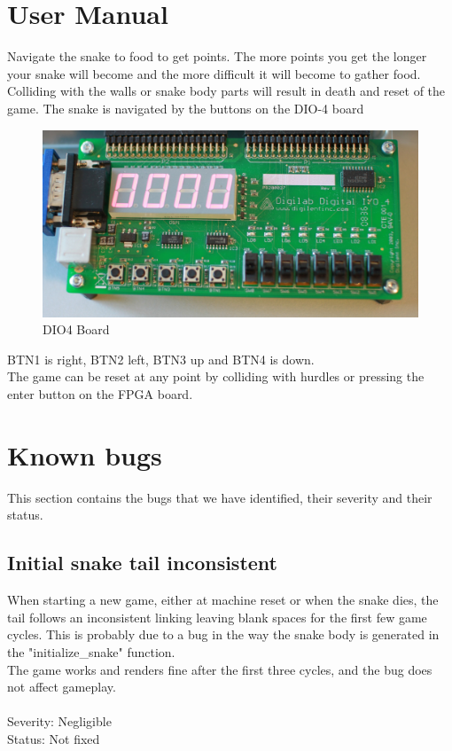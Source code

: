 \documentclass{acm_proc_article-sp}
\begin{document}
\section{User Manual}
Navigate the snake to food to get points. The more points you get the longer your snake will become and the more difficult it will become to gather food.
Colliding with the walls or snake body parts will result in death and reset of the game. The snake is navigated by the buttons on the DIO-4 board 
\begin{figure}[h]
\centering
\includegraphics[scale=0.064]{img/DIO4Buttons.jpg} 
\caption{DIO4 Board}
\label{fig:dio4board}
\end{figure}

BTN1 is right, BTN2 left, BTN3 up and BTN4 is down.\\
The game can be reset at any point by colliding with hurdles or pressing the enter button on the FPGA board.

\section{Known bugs}
This section contains the bugs that we have identified, their severity and their status.
\subsection{Initial snake tail inconsistent}
When starting a new game, either at machine reset or when the snake dies, the tail follows an inconsistent linking leaving blank spaces for the first few game cycles. This is probably due to a bug in the way the snake body is generated in the "initialize\_snake" function.\\
The game works and renders fine after the first three cycles, and the bug does not affect gameplay.\\\\
Severity: Negligible\\
Status: Not fixed
\end{document}
